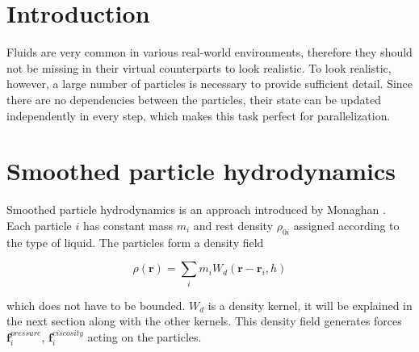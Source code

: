 \documentclass[a4paper,report]{IEEEtran}
\begin{document}


%
\IEEEpeerreviewmaketitle
 
\section{Introduction}
Fluids are very common in various real-world environments, therefore they should not be missing in their virtual counterparts to look realistic. To look realistic, however, a large number of particles is necessary to provide sufficient detail. Since there are no dependencies between the particles, their state can be updated independently in every step, which makes this task perfect for parallelization. 


\section{Smoothed particle hydrodynamics}
Smoothed particle hydrodynamics is an approach introduced by Monaghan \cite{Articles:Monaghan}.
Each particle $i$ has constant mass $m_{i}$ and rest density $\rho_{0i}$ assigned according to the type of liquid. The particles form a density field

\begin{equation}
	\rho(\mathbf{r}) = \sum_{i} m_{i}W_d(\mathbf{r}-\mathbf{r}_i, h)
\end{equation}

which does not have to be bounded. $W_d$ is a density kernel, it will be explained in the next section along with the other kernels. This density field generates forces $\mathbf{f}_{i}^{pressure}$, $\mathbf{f}_{i}^{viscosity}$ acting on the particles. 
\end{document}

